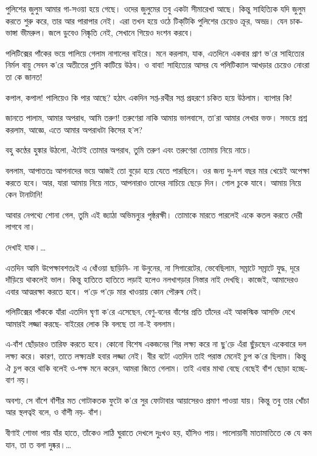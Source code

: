 \documentclass[a4paper,11pt]{article}
\begin{document}
\begin{multicols}{3}
{\begin{spacing}{1.15}
    পুলিশের জুলুম আমার গা-সওয়া হয়ে গেছে। ওদের জুলুমের তবু একটা সীমারেখা আছে। কিন্তু সাহিত্যিক যদি জুলুম করতে শুরু করে, তার আর পারাপার নেই। এরা তখন হয়ে ওঠে টিক্‌টিকি পুলিশের চেয়েও ক্রূর, অভদ্র। যেন চাক-ভাঙ্গা ভীমরুল। জলে ডুবেও নিষ্কৃতি নেই, সেখানে গিয়েও দংশন করবে।

    পলিটিক্সের পাঁকের ভয়ে পালিয়ে গেলাম নাগালের বাইরে। মনে করলাম, যাক, এতদিনে একবার প্রাণ ভ’রে সাহিত্যের নির্মল বায়ু সেবন ক’রে অতীতের গ্লানি কাটিয়ে উঠব। ও বাবা! সাহিত্যের আসর যে পলিটিক্যাল আখড়ার চেয়েও নোংরা তা কে জানত!

কপাল, কপাল! পালিয়েও কি পার আছে? হঠাৎ একদিন সপ্ত-রথীর সপ্ত প্রহরণে চকিত হয়ে উঠলাম। ব্যাপার কি!

জানতে পালাম, আমার অপরাধ, আমি তরুণ! তরুণেরা নাকি আমায় ভালবাসে, তা’রা আমার লেখার ভক্ত। সভয়ে প্রশ্ন করলাম, আজ্ঞে, এতে আমার অপরাধটা কিসের হ’ল?

বহু কণ্ঠের হুঙ্কার উঠলো, ঐটেই তোমার অপরাধ, তুমি তরুণ এবং তরুণেরা তোমায় নিয়ে নাচে।

বললাম, আপাততঃ আপনাদের ভয়ে আজই তো বুড়ো হয়ে যেতে পারছিনে। ওর জন্য দু-দশ বছর মার খেয়েই অপেক্ষা করতে হবে। আর, যারা আমায় নিয়ে নাচে, আপনারাও তাদের নাচিয়ে ছেড়ে দিন। গোল চুকে যাবে। আমায় নিয়ে কেন টানাটানি!

আবার নেপথ্যে শোনা গেল, তুমি এই জ্যাঠা অভিমন্যুর পৃষ্ঠরক্ষী। তোমাকে মারতে পারলেই একে কতল করতে দেরী লাগবে না।

দেখাই যাক।…

এতদিন আমি উপেক্ষাবশতঃই এ ধোঁওয়া ছাড়িনি- না উনুনের, না সিগারেটের, ভেবেছিলাম, সম্রাটে সম্রাটে যুদ্ধ, দূরে দাঁড়িয়ে থাকলেই ভাল। কিন্তু হাতিতে হাতিতে লড়াই হলেও নলখাগড়ার নিস্তার নাই দেখছি। কাজেই, আমাদেরও এবার আত্মরক্ষা করতে হবে। প’ড়ে প’ড়ে মার খাওয়ায় কোন পৌরুষ নেই।

পলিটিক্সের পাঁককে যাঁরা এতদিন ঘৃণা ক’রে এসেছেন, বেণু-বনের বাঁশের প্রতি তাঁদের এই আকস্মিক আসক্তি দেখে আমারই লজ্জা করছে- বাইরের লোক কি বলছে তা না-ই বললাম।

এ-বাঁশ ছোঁড়ারও তারিফ করতে হবে। কোনো বিশেষ একজনের শির লক্ষ্য করে না ছু’ড়ে এঁরা ছুঁড়ছেন একেবারে দল লক্ষ্য করে। কারণ, তাতে লক্ষ্যভ্রষ্ট হবার লজ্জা নেই। বীর বটে! এতদিন তাই পরাস্ত মেনেই চুপ ক’রে ছিলাম। কিন্তু ঐ চুপ করে থাকি বলেই ও-পক্ষ মনে করেন, আমরা জিতে গেলাম। তাই এবার মাথা বেছে বেছেই বাঁশ ছোড়া হচ্ছে- বাণ নয়।

অবশ্য, সে বাঁশে বাঁশীর মত গোটাকতক ফুটো ক’রে সুর ফোটাবার আয়াসেরও প্রমাণ পাওয়া যায়। কিন্তু তবু তার খোঁচা আর স্থলত্বই বলে, ও বাঁশী নয়- বাঁশ।

বীণাই শোভা পায় যাঁর হাতে, তাঁকেও লাঠি ঘুরাতে দেখলে দুঃখও হয়, হাঁসিও পায়। পালোয়ানী মাতামাতিতে কে যে কম যান, তা ত বলা দুষ্কর।…


\end{spacing}}
\end{multicols}
\end{document}
